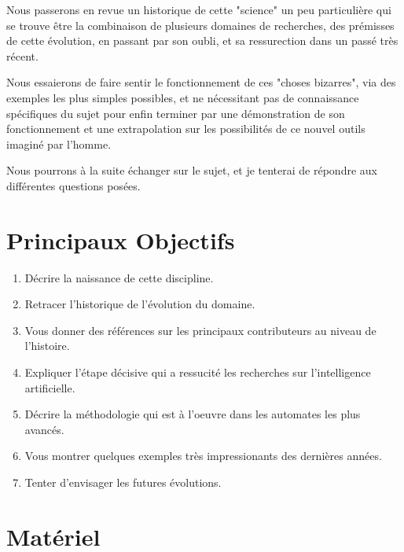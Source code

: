 \documentclass[a0,landscape]{a0poster}
\begin{document}
\begin{multicols}{4}
Nous passerons en revue un historique de cette "science" un peu particulière qui se trouve être la combinaison de plusieurs domaines de recherches, des prémisses de cette évolution, en passant par son oubli, et sa ressurection dans un passé très récent.

Nous essaierons de faire sentir le fonctionnement de ces "choses bizarres", via des exemples les plus simples possibles, et ne nécessitant pas de connaissance spécifiques du sujet pour enfin terminer par une démonstration de son fonctionnement et une extrapolation sur les possibilités de ce nouvel outils imaginé par l'homme.

Nous pourrons à la suite échanger sur le sujet, et je tenterai de répondre aux différentes questions posées.

\color{DarkSlateGrey} %

\section*{Principaux Objectifs}

\begin{enumerate}
\item Décrire la naissance de cette discipline.
\item Retracer l'historique de l'évolution du domaine.
\item Vous donner des références sur les principaux contributeurs au niveau de l'histoire.
\item Expliquer l'étape décisive qui a ressucité les recherches sur l'intelligence artificielle.
\item Décrire la méthodologie qui est à l'oeuvre dans les automates les plus avancés.
\item Vous montrer quelques exemples très impressionants des dernières années.
\item Tenter d'envisager les futures évolutions.
\end{enumerate}


\section*{Matériel}


\end{multicols}
\end{document}
